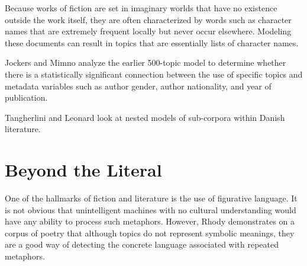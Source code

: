  Because works of fiction are set in imaginary worlds that have no existence outside the work itself, they are often characterized by words such as character names that are extremely frequent locally but never occur elsewhere. Modeling these documents can result in topics that are essentially lists of character names.

Jockers and Mimno \citep{jockers-13b} analyze the earlier 500-topic model to determine whether there is a statistically significant connection between the use of specific topics and metadata variables such as author gender, author nationality, and year of publication.

Tangherlini and Leonard \citep{tangherlini-13} look at nested models of sub-corpora within Danish literature.

\section{Beyond the Literal}

One of the hallmarks of fiction and literature is the use of figurative language.
It is not obvious that unintelligent machines with no cultural understanding would have any ability to process such metaphors. However, Rhody \citep{rhody-12} demonstrates on a corpus of poetry that although topics do not represent symbolic meanings, they are a good way of detecting the concrete language associated with repeated metaphors.